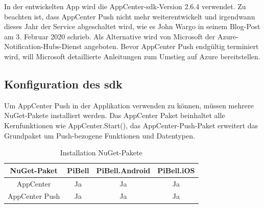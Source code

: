 In der entwickelten App wird die AppCenter-\ac{sdk}-Version 2.6.4 verwendet. Zu beachten ist, dass AppCenter Push nicht mehr weiterentwickelt und irgendwann dieses Jahr der Service abgeschaltet wird, wie es John Wargo in seinem Blog-Post am 3. Februar 2020 schrieb. Als Alternative wird von Microsoft der Azure-Notification-Hubs-Dienst angeboten. Bevor AppCenter Push endgültig terminiert wird, will Microsoft detaillierte Anleitungen zum Umstieg auf Azure bereitstellen.\par

\subsection{Konfiguration des \ac{sdk}}
Um AppCenter Push in der Applikation verwenden zu können, müssen mehrere NuGet-Pakete installiert werden.
Das AppCenter Paket beinhaltet alle Kernfunktionen wie AppCenter.Start(), das AppCenter-Push-Paket erweitert das Grundpaket um Push-bezogene Funktionen und Datentypen.
\begin{table}[H]
    \centering\begin{tabular}{|c|c|c|c|}
        \hline
        NuGet-Paket & PiBell & PiBell.Android & PiBell.iOS\\
        \hline
        AppCenter & Ja & Ja & Ja\\
        AppCenter Push & Ja & Ja & Ja\\
        \hline    
    \end{tabular}
    \caption{Installation NuGet-Pakete}
\end{table}